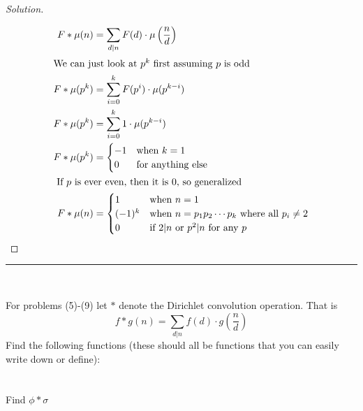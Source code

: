 \documentclass[11pt]{article}
\newenvironment{myproblem}[1][Problem]{\begin{trivlist}
    \item[\hskip \labelsep {\bfseries #1.}]}{\end{trivlist}}
\newenvironment{solution}
  {\renewcommand\qedsymbol{$~$}\begin{proof}[Solution]$ $\par\nobreak\ignorespaces}
  {\end{proof}}
\begin{document}
\begin{solution}
  \begin{align*}
    F * \mu(n)   & = \sum_{d|n} F(d) \cdot \mu\left(\frac{n}{d}\right)               \\
    \intertext{We can just look at $p^k$ first assuming $p$ is odd}
    F * \mu(p^k) & = \sum_{i=0}^k F(p^i) \cdot \mu(p^{k-i})                          \\
    F * \mu(p^k) & = \sum_{i=0}^k 1 \cdot \mu(p^{k-i})                               \\
    F * \mu(p^k) & = \begin{cases}
                       -1 & \text{when $k=1$}        \\
                       0  & \text{for anything else} \\
                     \end{cases}                                   \\
    \intertext{ If $p$ is ever even, then it is 0, so generalized}
    F * \mu(n)   & = \begin{cases}
                       1      & \text{when $n=1$}                                      \\
                       (-1)^k & \text{when $n=p_1p_2\cdots p_k$ where all $p_i\neq 2$} \\
                       0      & \text{if $2|n$ or $p^2|n$ for any $p$}
                     \end{cases}
  \end{align*}

\end{solution}

\hrule
~\newline

For problems (5)-(9) let $*$ denote the Dirichlet convolution operation. That is
\[
  f * g(n) = \sum_{d|n} f(d) \cdot g\left(\frac{n}{d}\right)
\]
Find the following functions (these should all be functions that you can easily write down or define):


\section{}

\begin{myproblem}
  Find $\phi * \sigma$
\end{myproblem}
\end{document}
